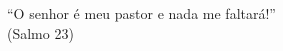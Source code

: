\documentclass[12pt,oneside,a4paper,chapter=TITLE,
			   english,brazil]{abntex2}
\begin{document}
\begin{epigrafe}
    \vspace*{\fill}
	\begin{flushright}
		``O senhor é meu pastor e nada me faltará!'' \\
	                             (Salmo 23)
	\end{flushright}
\end{epigrafe}


\end{document}
